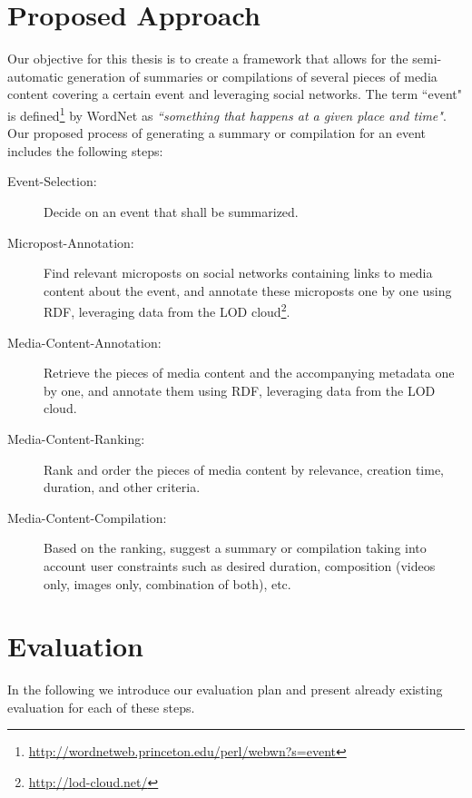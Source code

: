 \documentclass[runningheads,a4paper]{llncs}
\begin{document}
\section{Proposed Approach}
Our objective for this thesis is to create a framework that allows for the semi-automatic generation of summaries or compilations of several pieces of media content covering a certain event and leveraging social networks. The term ``event" is defined\footnote{\url{http://wordnetweb.princeton.edu/perl/webwn?s=event}} by WordNet as \textit{``something that happens at a given place and time"}. Our proposed process of generating a summary or compilation for an event includes the following steps:

\begin{description}
\item [Event-Selection:] Decide on an event that shall be summarized.
\item [Micropost-Annotation:] Find relevant microposts on social networks containing links to media content about the event, and annotate these microposts one by one using RDF, leveraging data from the LOD cloud\footnote{\url{http://lod-cloud.net/}}.
\item [Media-Content-Annotation:] Retrieve the pieces of media content and the accompanying metadata one by one, and annotate them using RDF, leveraging data from the LOD cloud.
\item [Media-Content-Ranking:] Rank and order the pieces of media content by relevance, creation time, duration, and other criteria.
\item [Media-Content-Compilation:] Based on the ranking, suggest a summary or compilation taking into account user constraints such as desired duration, composition (videos only, images only, combination of both), etc.
\end{description}

\section{Evaluation}
In the following we introduce our evaluation plan and present already existing evaluation for each of these steps.
\end{document}
